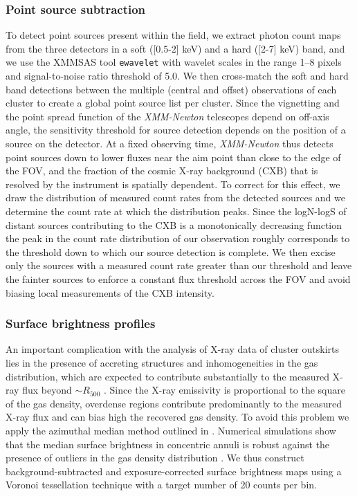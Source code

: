 \documentclass[traditabstract   ]{aa} %
\begin{document}
\subsubsection{Point source subtraction}
\label{sec:ps}

To detect point sources present within the field, we extract photon count maps from the three detectors in  a soft ([0.5-2] keV) and a hard  ([2-7] keV) band, and we use the XMMSAS tool \texttt{ewavelet} with wavelet scales in the range 1--8 pixels and signal-to-noise ratio threshold of 5.0. We then cross-match the soft and hard band detections between the multiple (central and offset) observations of each cluster to create a global point source list per cluster. Since the vignetting and the point spread function of the \emph{XMM-Newton} telescopes depend on off-axis angle, the sensitivity threshold for source detection depends on the position of a source on the detector. At a fixed observing time, \emph{XMM-Newton} thus detects point sources down to lower fluxes near the aim point than close to the edge of the FOV, and the fraction of the cosmic X-ray background (CXB) that is resolved by the instrument is spatially dependent. To correct for this effect, we draw the distribution of measured count rates from the detected sources and we determine the count rate at which the distribution peaks. Since the logN-logS of distant sources contributing to the CXB is a monotonically decreasing function \citep[e.g.,][]{moretti03} the peak in the count rate distribution of our observation roughly corresponds to the threshold down to which our source detection is complete. We then excise only the sources with a measured count rate greater than our threshold and leave the fainter sources to enforce a constant flux threshold across the FOV and avoid biasing local measurements of the CXB intensity.



\subsubsection{Surface brightness profiles}

An important complication with the analysis of X-ray data of cluster outskirts lies in the presence of accreting structures and inhomogeneities in the gas distribution, which are expected to contribute substantially to the measured X-ray flux beyond $\sim R_{500}$ \citep[e.g.,][]{nagai11,vazza13,roncarelli+13}. Since the X-ray emissivity is proportional to the square of the gas density, overdense regions contribute predominantly to the measured X-ray flux and can bias high the recovered gas density. To avoid this problem we apply the azimuthal median method outlined in \citet{eckert15}. Numerical simulations show that the median surface brightness in concentric annuli is robust against the presence of outliers in the gas density distribution \citep{zhuravleva13}. We thus construct background-subtracted and exposure-corrected surface brightness maps using a Voronoi tessellation technique \citep{cappellari03} with a target number of 20 counts per bin. 
\end{document}
